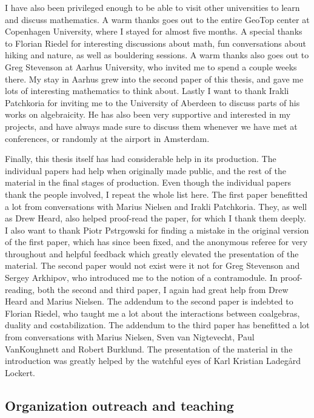 I have also been privileged enough to be able to visit other universities to learn and discuss mathematics. A warm thanks goes out to the entire GeoTop center at Copenhagen University, where I stayed for almost five months. A special thanks to Florian Riedel for interesting discussions about math, fun conversations about hiking and nature, as well as bouldering sessions. A warm thanks also goes out to Greg Stevenson at Aarhus University, who invited me to spend a couple weeks there. My stay in Aarhus grew into the second paper of this thesis, and gave me lots of interesting mathematics to think about. Lastly I want to thank Irakli Patchkoria for inviting me to the University of Aberdeen to discuss parts of his works on algebraicity. He has also been very supportive and interested in my projects, and have always made sure to discuss them whenever we have met at conferences, or randomly at the airport in Amsterdam. 

Finally, this thesis itself has had considerable help in its production. The individual papers had help when originally made public, and the rest of the material in the final stages of production. Even though the individual papers thank the people involved, I repeat the whole list here. The first paper benefitted a lot from conversations with Marius Nielsen and Irakli Patchkoria. They, as well as Drew Heard, also helped proof-read the paper, for which I thank them deeply. I also want to thank Piotr Pstr\a{}gowski for finding a mistake in the original version of the first paper, which has since been fixed, and the anonymous referee for very throughout and helpful feedback which greatly elevated the presentation of the material. The second paper would not exist were it not for Greg Stevenson and Sergey Arkhipov, who introduced me to the notion of a contramodule. In proof-reading, both the second and third paper, I again had great help from Drew Heard and Marius Nielsen. The addendum to the second paper is indebted to Florian Riedel, who taught me a lot about the interactions between coalgebras, duality and costabilization. The addendum to the third paper has benefitted a lot from conversations with Marius Nielsen, Sven van Nigtevecht, Paul VanKoughnett and Robert Burklund. The presentation of the material in the introduction was greatly helped by the watchful eyes of Karl Kristian Ladegård Lockert. 


\subsection*{Organization outreach and teaching}

